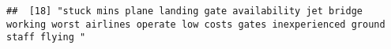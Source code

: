 \documentclass[
]{article}
\begin{document}
\begin{verbatim}
##  [18] "stuck mins plane landing gate availability jet bridge working worst airlines operate low costs gates inexperienced ground staff flying "                                                                                                                                                                                                                                                                                                                                                                                                                                                                                                                                                                                                                                                                                                                                                                                                                                                                                                                                                                                                                                                                                                                                                                                                                                                                                                                                                                                                                                                                                                                                                                                                                                                       

\end{verbatim}
\end{document}
